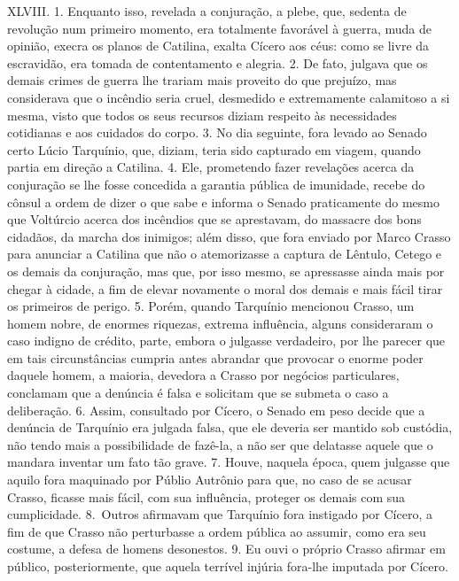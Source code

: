 XLVIII. 1. Enquanto isso, revelada a conjuração, a plebe, que, sedenta de
revolução num primeiro momento, era totalmente favorável à guerra, muda de
opinião, execra os planos de Catilina, exalta Cícero aos céus: como se livre da
escravidão, era tomada de contentamento e alegria. 2. De fato, julgava que os
demais crimes de guerra lhe trariam mais proveito do que prejuízo, mas
considerava que o incêndio seria cruel, desmedido e extremamente calamitoso a
si mesma, visto que todos os seus recursos diziam respeito às necessidades
cotidianas e aos cuidados do corpo. 3. No dia seguinte, fora levado ao Senado
certo Lúcio Tarquínio, que, diziam, teria sido capturado em viagem, quando
partia em direção a Catilina. 4. Ele, prometendo fazer revelações acerca da
conjuração se lhe fosse concedida a garantia pública de imunidade, recebe do
cônsul a ordem de dizer o que sabe e informa o Senado praticamente do mesmo que
Voltúrcio acerca dos incêndios que se aprestavam, do massacre dos bons
cidadãos, da marcha dos inimigos; além disso, que fora enviado por Marco Crasso
para anunciar a Catilina que não o atemorizasse a captura de Lêntulo, Cetego e
os demais da conjuração, mas que, por isso mesmo, se apressasse ainda mais por
chegar à cidade, a fim de elevar novamente o moral dos demais e mais fácil
tirar os primeiros de perigo. 5. Porém, quando Tarquínio mencionou Crasso, um
homem nobre, de enormes riquezas, extrema influência, alguns consideraram o
caso indigno de crédito, parte, embora o julgasse verdadeiro, por lhe parecer
que em tais circunstâncias cumpria antes abrandar que provocar o enorme poder
daquele homem, a maioria, devedora a Crasso por negócios particulares,
conclamam que a denúncia é falsa e solicitam que se submeta o caso a
deliberação. 6. Assim, consultado por Cícero, o Senado em peso decide que a
denúncia de Tarquínio era julgada falsa, que ele deveria ser mantido sob
custódia, não tendo mais a possibilidade de fazê-la, a não ser que delatasse aquele que
o mandara inventar um fato tão grave. 7. Houve, naquela época, quem julgasse
que aquilo fora maquinado por Públio Autrônio para que, no caso de se acusar
Crasso, ficasse mais fácil, com sua influência, proteger os demais com sua
cumplicidade. 8.~Outros afirmavam que Tarquínio fora instigado por Cícero, a
fim de que Crasso não perturbasse a ordem pública ao assumir, como era seu
costume, a defesa de homens desonestos. 9. Eu ouvi o próprio Crasso afirmar em
público, posteriormente, que aquela terrível injúria fora-lhe imputada por
Cícero.

